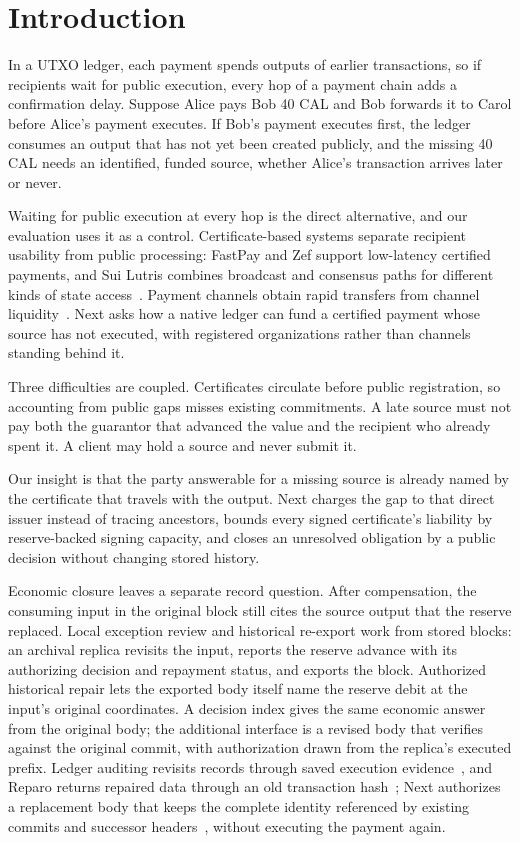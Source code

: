 \section{Introduction}
\label{sec:introduction}

In a UTXO ledger, each payment spends outputs of earlier transactions, so if recipients wait for public execution, every hop of a payment chain adds a confirmation delay. Suppose Alice pays Bob 40 CAL and Bob forwards it to Carol before Alice's payment executes. If Bob's payment executes first, the ledger consumes an output that has not yet been created publicly, and the missing 40 CAL needs an identified, funded source, whether Alice's transaction arrives later or never.

Waiting for public execution at every hop is the direct alternative, and our evaluation uses it as a control. Certificate-based systems separate recipient usability from public processing: FastPay and Zef support low-latency certified payments, and Sui Lutris combines broadcast and consensus paths for different kinds of state access~\cite{fastpay,zef,lutris}. Payment channels obtain rapid transfers from channel liquidity~\cite{blitz,donner}. Next asks how a native ledger can fund a certified payment whose source has not executed, with registered organizations rather than channels standing behind it.

Three difficulties are coupled. Certificates circulate before public registration, so accounting from public gaps misses existing commitments. A late source must not pay both the guarantor that advanced the value and the recipient who already spent it. A client may hold a source and never submit it.

Our insight is that the party answerable for a missing source is already named by the certificate that travels with the output. Next charges the gap to that direct issuer instead of tracing ancestors, bounds every signed certificate's liability by reserve-backed signing capacity, and closes an unresolved obligation by a public decision without changing stored history.

Economic closure leaves a separate record question. After compensation, the
consuming input in the original block still cites the source output that
the reserve replaced. Local exception review and historical re-export work
from stored blocks: an archival replica revisits the input, reports the
reserve advance with its authorizing decision and repayment status, and
exports the block. Authorized historical repair lets the exported body
itself name the reserve debit at the input's original coordinates. A
decision index gives the same economic answer from the original body; the
additional interface is a revised body that verifies against the original
commit, with authorization drawn from the replica's executed prefix. Ledger
auditing revisits records through saved execution evidence~\cite{ia-ccf},
and Reparo returns repaired data through an old transaction
hash~\cite{reparo}; Next authorizes a replacement body that keeps the
complete identity referenced by existing commits and successor
headers~\cite{comet-blockid}, without executing the payment again.

